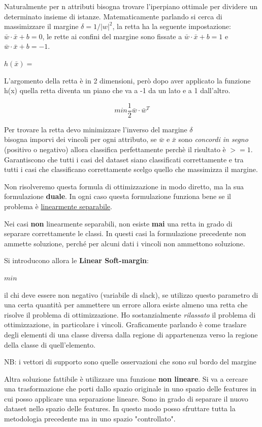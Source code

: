 Naturalmente per n attributi bisogna trovare l'iperpiano ottimale per dividere un determinato insieme di istanze. Matematicamente parlando si cerca di massimizzare il margine $\delta = 1 / |w|^2$, la retta ha la seguente impostazione: $\bar{w} \cdot \bar{x} + b = 0$, le rette ai confini del margine sono fissate a $\bar{w} \cdot \bar{x} + b = 1$ e $\bar{w} \cdot \bar{x} + b = -1$. 

$h(\bar{x}) = $

L'argomento della retta \`e in 2 dimensioni, per\`o dopo aver applicato la funzione h(x) quella retta diventa un piano che va a -1 da un lato e a 1 dall'altro.

\[min \frac{1}{2}\bar{w} \cdot \bar{w}^T \]

Per trovare la retta devo minimizzare l'inverso del margine $\delta$\\
bisogna imporvi dei vincoli per ogni attributo, se $\bar{w}$ e $\bar{x}$ sono \textit{concordi in segno} (positivo o negativo) allora classifica perfettamente perch\`e il risultato è $>= 1$. Garantiscono che tutti i casi del dataset siano classificati correttamente e tra tutti i casi che classificano correttamente scelgo quello che massimizza il margine. 

Non risolveremo questa formula di ottimizzazione in modo diretto, ma la sua formulazione \textbf{duale}. In ogni caso questa formulazione funziona bene se il problema \`e \underline{linearmente separabile}.

Nei casi \textbf{non} linearmente separabili, non esiste \textbf{mai} una retta in grado di separare correttamente le classi. In questi casi la formulazione precedente non ammette soluzione, perch\'e per alcuni dati i vincoli non ammettono soluzione. 

Si introducono allora le \textbf{Linear Soft-margin}:

$min $

il chi deve essere non negativo (variabile di slack), se utilizzo questo parametro di una certa quantit\`a per ammettere un errore allora esiste almeno una retta che risolve il problema di ottimizzazione. Ho sostanzialmente \textit{rilassato} il problema di ottimizzazione, in particolare i vincoli. Graficamente parlando \`e come traslare degli elementi di una classe diversa dalla regione di appartenenza verso la regione della classe di quell'elemento.

NB: i vettori di supporto sono quelle osservazioni che sono sul bordo del margine

Altra soluzione fattibile \`e utilizzare una funzione \textbf{non lineare}. Si va a cercare una trasformazione che porti dallo spazio originale in uno spazio delle features in cui posso applicare una separazione lineare. Sono in grado di separare il nuovo dataset nello spazio delle features. In questo modo posso sfruttare tutta la metodologia precedente ma in uno spazio "controllato". 

